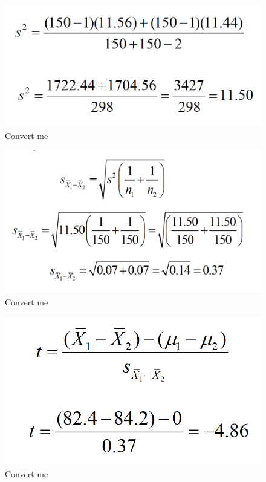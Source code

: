 \documentclass[]{book}
\theoremstyle{definition}
\theoremstyle{definition}
\theoremstyle{definition}
\theoremstyle{remark}
\begin{document}
\begin{figure}
\centering
\includegraphics{img/hickssampling15.png}
\caption{Convert me}
\end{figure}

\begin{figure}
\centering
\includegraphics{img/hickssampling16.png}
\caption{Convert me}
\end{figure}

\begin{figure}
\centering
\includegraphics{img/hickssampling17.png}
\caption{Convert me}
\end{figure}
\end{document}
